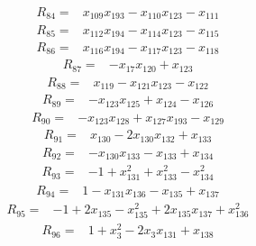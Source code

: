 {%
\begin{align*}
R_{84} ={}& x_{109} x_{193} - x_{110} x_{123} - x_{111}
\end{align*}
\begin{align*}
R_{85} ={}& x_{112} x_{194} - x_{114} x_{123} - x_{115}
\end{align*}
\begin{align*}
R_{86} ={}& x_{116} x_{194} - x_{117} x_{123} - x_{118}
\end{align*}
\begin{align*}
R_{87} ={}& -x_{17} x_{120} + x_{123}
\end{align*}
\begin{align*}
R_{88} ={}& x_{119} - x_{121} x_{123} - x_{122}
\end{align*}
\begin{align*}
R_{89} ={}& -x_{123} x_{125} + x_{124} - x_{126}
\end{align*}
\begin{align*}
R_{90} ={}& -x_{123} x_{128} + x_{127} x_{193} - x_{129}
\end{align*}
\begin{align*}
R_{91} ={}& x_{130} - 2x_{130} x_{132} + x_{133}
\end{align*}
\begin{align*}
R_{92} ={}& -x_{130} x_{133} - x_{133} + x_{134}
\end{align*}
\begin{align*}
R_{93} ={}& -1 + x_{131}^{2} + x_{133}^{2} - x_{134}^{2}
\end{align*}
\begin{align*}
R_{94} ={}& 1 - x_{131} x_{136} - x_{135} + x_{137}
\end{align*}
\begin{align*}
R_{95} ={}& -1 + 2x_{135} - x_{135}^{2} + 2x_{135} x_{137} + x_{136}^{2}
\end{align*}
\begin{align*}
R_{96} ={}& 1 + x_{3}^{2} - 2x_{3} x_{131} + x_{138}
\end{align*}
}
